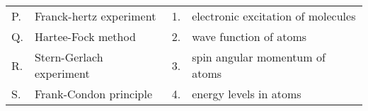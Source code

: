 \begin{tabular}{p{0.1cm}  p{4cm} p{0.1cm} p{13cm}}
     P.& Franck-hertz experiment& 1. & electronic excitation of molecules  \\
     Q. & Hartee-Fock method & 2. & wave function of atoms  \\
     R. & Stern-Gerlach experiment & 3. & spin angular momentum of atoms \\
     S.& Frank-Condon principle & 4. & energy levels in atoms
\end{tabular}
